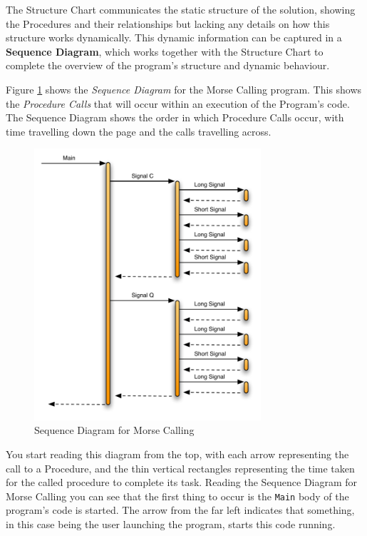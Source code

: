 The Structure Chart communicates the static structure of the solution, showing the Procedures and their relationships but lacking any details on how this structure works dynamically. This dynamic information can be captured in a \textbf{Sequence Diagram}, which works together with the Structure Chart to complete the overview of the program's structure and dynamic behaviour.

Figure \ref{fig:procedure-decl-morsecalling-sequence} shows the \emph{Sequence Diagram} for the Morse Calling program. This shows the \emph{Procedure Calls} that will occur within an execution of the Program's code. The Sequence Diagram shows the order in which Procedure Calls occur, with time travelling down the page and the calls travelling across. 

\begin{figure}[htbp]
   \centering
   \includegraphics[width=0.75\textwidth]{./topics/procedure-decl/diagrams/MorseCallingSequenceDiagram} 
   \caption{Sequence Diagram for Morse Calling}
   \label{fig:procedure-decl-morsecalling-sequence}
\end{figure}

You start reading this diagram from the top, with each arrow representing the call to a Procedure, and the thin vertical rectangles representing the time taken for the called procedure to complete its task. Reading the Sequence Diagram for Morse Calling you can see that the first thing to occur is the \texttt{Main} body of the program's code is started. The arrow from the far left indicates that something, in this case being the user launching the program, starts this code running.

